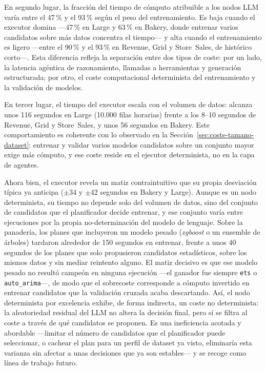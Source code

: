\documentclass[12pt,a4paper]{article}
\theoremstyle{plain}
\begin{document}
En segundo lugar, la fracción del tiempo de cómputo atribuible a los nodos LLM varía entre el
47\,\% y el 93\,\% según el peso del entrenamiento. Es baja cuando el executor domina —47\,\% en
Large y 63\,\% en Bakery, donde entrenar varios candidatos sobre más datos concentra el tiempo— y
alta cuando el entrenamiento es ligero —entre el 90\,\% y el 93\,\% en Revenue, Grid y
Store~Sales, de histórico corto—. Esta diferencia refleja la separación entre dos tipos de coste:
por un lado, la latencia agéntica de razonamiento, llamadas a herramientas y generación
estructurada; por otro, el coste computacional determinista del entrenamiento y la validación de
modelos.

En tercer lugar, el tiempo del executor escala con el volumen de datos: alcanza unos 116 segundos
en Large (10.000 filas horarias) frente a los 8--10 segundos de Revenue, Grid y Store~Sales, y
unos 56 segundos en Bakery. Este comportamiento es coherente con lo observado en la
Sección~\ref{sec:coste-tamano-dataset}: entrenar y validar varios modelos candidatos sobre un
conjunto mayor exige más cómputo, y ese coste reside en el ejecutor determinista, no en la capa
de agentes.

Ahora bien, el executor revela un matiz contraintuitivo que su propia desviación típica ya
anticipa ($\pm$34 y $\pm$42 segundos en Bakery y Large). Aunque es un nodo determinista, su tiempo
no depende solo del volumen de datos, sino del conjunto de candidatos que el planificador
decide entrenar, y ese conjunto varía entre ejecuciones por la propia no-determinación del modelo
de lenguaje. Sobre la panadería, los planes que incluyeron un modelo pesado (\textit{xgboost} o un
ensemble de árboles) tardaron alrededor de 150 segundos en entrenar, frente a unos 40 segundos de
los planes que solo propusieron candidatos estadísticos, sobre los mismos datos y sin
mediar reintento alguno. El matiz decisivo es que ese modelo pesado no resultó campeón en ninguna
ejecución —el ganador fue siempre \texttt{ets} o \texttt{auto\_arima}—, de modo que el sobrecoste
corresponde a cómputo invertido en entrenar candidatos que la validación cruzada acaba
descartando. Así, el nodo determinista por excelencia exhibe, de forma indirecta, un coste no
determinista: la aleatoriedad residual del LLM no altera la decisión final, pero sí se filtra al
coste a través de qué candidatos se proponen. Es una ineficiencia acotada y abordable
—limitar el número de candidatos que el planificador puede seleccionar, o cachear el plan para un
perfil de dataset ya visto, eliminaría esta varianza sin afectar a unas decisiones que ya son
estables— y se recoge como línea de trabajo futuro.
\end{document}
